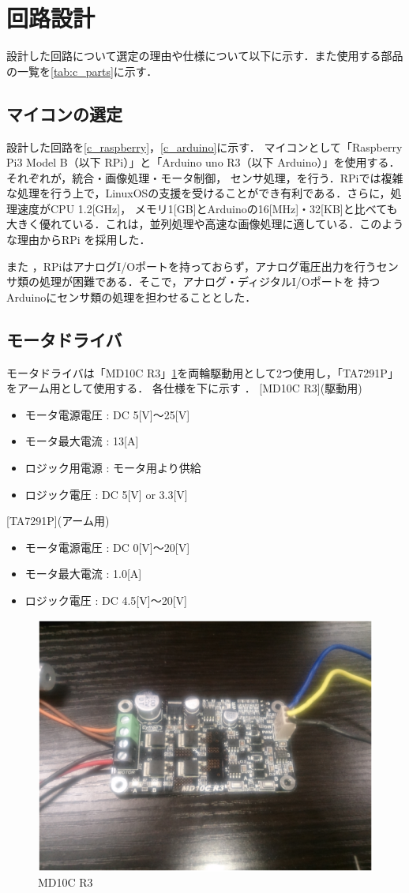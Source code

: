 \documentclass[10pt,a4j]{jarticle}
\begin{document}
\section{回路設計}
設計した回路について選定の理由や仕様について以下に示す．また使用する部品の一覧を\ref{tab:c_parts}に示す．
\subsection{マイコンの選定}
設計した回路を\ref{c_raspberry}，\ref{c_arduino}に示す．
マイコンとして「Raspberry Pi3 Model B（以下 RPi）」と「Arduino uno R3（以下 Arduino）」を使用する．それぞれが，統合・画像処理・モータ制御，
センサ処理，を行う．RPiでは複雑な処理を行う上で，LinuxOSの支援を受けることができ有利である．さらに，処理速度がCPU 1.2[GHz]，
メモリ1[GB]とArduinoの16[MHz]・32[KB]と比べても大きく優れている．これは，並列処理や高速な画像処理に適している．このような理由からRPi
を採用した．

また ，RPiはアナログI/Oポートを持っておらず，アナログ電圧出力を行うセンサ類の処理が困難である．そこで，アナログ・ディジタルI/Oポートを
持つArduinoにセンサ類の処理を担わせることとした．
\subsection{モータドライバ}
モータドライバは「MD10C R3」\ref{MD10C}を両輪駆動用として2つ使用し，「TA7291P」をアーム用として使用する．
各仕様を下に示す
．
[MD10C R3](駆動用)
\begin{itemize}
 \item モータ電源電圧 : DC 5[V]$〜$25[V]
 \item モータ最大電流 : 13[A]
 \item ロジック用電源 : モータ用より供給
 \item ロジック電圧   : DC 5[V] or 3.3[V]
\end{itemize}

[TA7291P](アーム用)
\begin{itemize}
 \item モータ電源電圧 : DC 0[V]$〜$20[V]
 \item モータ最大電流 : 1.0[A]
 \item ロジック電圧 : DC 4.5[V]$〜$20[V]
\end{itemize}
\begin{figure}[b]
 \centering
 \includegraphics[width=0.5\hsize]{../Circuit/picture/MD10C.eps}
    \caption{MD10C R3}
    \label{MD10C}
\end{figure}
\end{document}
